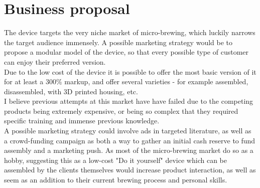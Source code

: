 \documentclass[twoside]{ctuthesis}
\theoremstyle{plain}
\theoremstyle{definition}
\theoremstyle{note}
\begin{document}
\pagebreak

\section{Business proposal}
The device targets the very niche market of micro-brewing, which luckily narrows the target audience immensely. A possible marketing strategy would be to propose a modular model of the device, so that every possible type of customer can enjoy their preferred version.\\
Due to the low cost of the device it is possible to offer the most basic version of it for at least a 300$\%$ markup, and offer several varieties - for example assembled, disassembled, with 3D printed housing, etc.\\
I believe previous attempts at this market have have failed due to the competing products being extremely expensive, or being so complex that they required specific training and immense previous knowledge.\\
A possible marketing strategy could involve ads in targeted literature, as well as a crowd-funding campaign as both a way to gather an initial cash reserve to fund assembly and a marketing push. As most of the micro-brewing market do so as a hobby, suggesting this as a low-cost "Do it yourself" device which can be assembled by the clients themselves would increase product interaction, as well as seem as an addition to their current brewing process and personal skills.
\end{document}
